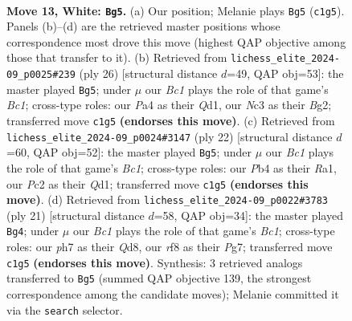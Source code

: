 \documentclass[11pt]{article}
\begin{document}
\clearpage

\begin{figure}[p]\centering
\begin{subfigure}{0.46\textwidth}\centering
\resizebox{\linewidth}{!}{%
\newchessgame
\chessboard[
  setfen={1nbq1rk1/r3bppp/pp1p1n2/4p3/PP2P3/2NB1N2/2P2PPP/R1BQ1RK1 w - - 0 13},
  showmover=false,
  pgfstyle=straightmove, color=movearrow, markmove={c1-g5}
]}
\caption{}
\end{subfigure}\hfill
\begin{subfigure}{0.46\textwidth}\centering
\resizebox{\linewidth}{!}{%
\newchessgame
\chessboard[
  setfen={r1bq1rk1/pp2bppp/4pn2/n2p4/3P4/PPN2NP1/4PPBP/R1BQ1RK1 w - - 1 14},
  showmover=false,
  pgfstyle=straightmove, color=movearrow, markmove={c1-g5}
]}
\caption{}
\end{subfigure}
\\[4pt]
\begin{subfigure}{0.46\textwidth}\centering
\resizebox{\linewidth}{!}{%
\newchessgame
\chessboard[
  setfen={r1bq1rk1/4bppp/p1np1n2/1pp1p3/4P3/2PP1N2/PPB2PPP/R1BQRNK1 w - - 2 12},
  showmover=false,
  pgfstyle=straightmove, color=movearrow, markmove={c1-g5}
]}
\caption{}
\end{subfigure}\hfill
\begin{subfigure}{0.46\textwidth}\centering
\resizebox{\linewidth}{!}{%
\newchessgame
\chessboard[
  setfen={r1bq1rk1/pp2bppp/2n2n2/3p4/P1pP4/2P2N2/1PB2PPP/RNBQ1RK1 b - - 1 11},
  showmover=false,
  pgfstyle=straightmove, color=movearrow, markmove={c8-g4}
]}
\caption{}
\end{subfigure}
\caption{\textbf{Move 13, White: \texttt{Bg5}.} (a) Our position; Melanie plays \texttt{Bg5} (\texttt{c1g5}). Panels (b)--(d) are the retrieved master positions whose correspondence most drove this move (highest QAP objective among those that transfer to it). (b) Retrieved from \texttt{lichess\_elite\_2024-09\_p0025\#239} (ply 26) [structural distance $d$=49, QAP obj=53]: the master played \texttt{Bg5}; under $\mu$ our \emph{Bc1} plays the role of that game's \emph{Bc1}; cross-type roles: our \emph{P}a4 as their \emph{Q}d1, our \emph{N}c3 as their \emph{B}g2; transferred move \texttt{c1g5} \textbf{(endorses this move)}. (c) Retrieved from \texttt{lichess\_elite\_2024-09\_p0024\#3147} (ply 22) [structural distance $d$=60, QAP obj=52]: the master played \texttt{Bg5}; under $\mu$ our \emph{Bc1} plays the role of that game's \emph{Bc1}; cross-type roles: our \emph{P}b4 as their \emph{R}a1, our \emph{P}c2 as their \emph{Q}d1; transferred move \texttt{c1g5} \textbf{(endorses this move)}. (d) Retrieved from \texttt{lichess\_elite\_2024-09\_p0022\#3783} (ply 21) [structural distance $d$=58, QAP obj=34]: the master played \texttt{Bg4}; under $\mu$ our \emph{Bc1} plays the role of that game's \emph{Bc1}; cross-type roles: our \emph{p}h7 as their \emph{Q}d8, our \emph{r}f8 as their \emph{P}g7; transferred move \texttt{c1g5} \textbf{(endorses this move)}. Synthesis: 3 retrieved analogs transferred to \texttt{Bg5} (summed QAP objective 139, the strongest correspondence among the candidate moves); Melanie committed it via the \texttt{search} selector.}
\label{fig:thought-m24}
\end{figure}
\end{document}
